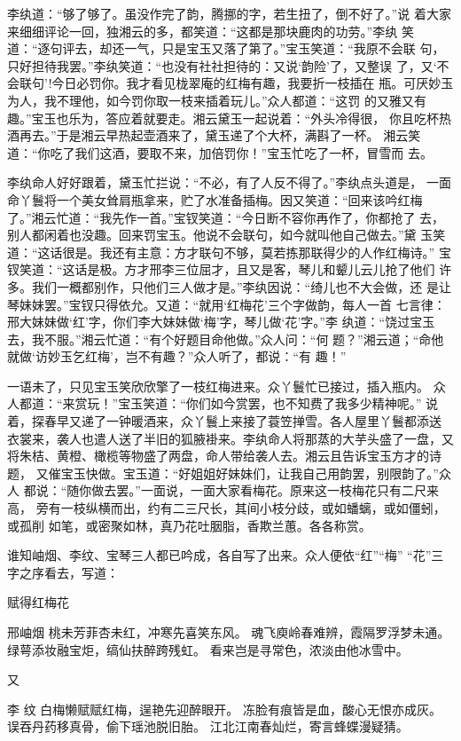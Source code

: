 李纨道：“够了够了。虽没作完了韵，腾挪的字，若生扭了，倒不好了。”说
着大家来细细评论一回，独湘云的多，都笑道：“这都是那块鹿肉的功劳。”李纨
笑道：“逐句评去，却还一气，只是宝玉又落了第了。”宝玉笑道：“我原不会联
句，只好担待我罢。”李纨笑道：“也没有社社担待的：又说‘韵险’了，又整误
了，又‘不会联句’!今日必罚你。我才看见栊翠庵的红梅有趣，我要折一枝插在
瓶。可厌妙玉为人，我不理他，如今罚你取一枝来插着玩儿。”众人都道：“这罚
的又雅又有趣。”宝玉也乐为，答应着就要走。湘云黛玉一起说着：“外头冷得很，
你且吃杯热酒再去。”于是湘云早热起壶酒来了，黛玉递了个大杯，满斟了一杯。
湘云笑道：“你吃了我们这酒，要取不来，加倍罚你！”宝玉忙吃了一杯，冒雪而
去。

李纨命人好好跟着，黛玉忙拦说：“不必，有了人反不得了。”李纨点头道是，
一面命丫鬟将一个美女耸肩瓶拿来，贮了水准备插梅。因又笑道：“回来该吟红梅
了。”湘云忙道：“我先作一首。”宝钗笑道：“今日断不容你再作了，你都抢了
去，别人都闲着也没趣。回来罚宝玉。他说不会联句，如今就叫他自己做去。”黛
玉笑道：“这话很是。我还有主意：方才联句不够，莫若拣那联得少的人作红梅诗。”
宝钗笑道：“这话是极。方才邢李三位屈才，且又是客，琴儿和颦儿云儿抢了他们
许多。我们一概都别作，只他们三人做才是。”李纨因说：“绮儿也不大会做，还
是让琴妹妹罢。”宝钗只得依允。又道：“就用‘红梅花’三个字做韵，每人一首
七言律：邢大妹妹做‘红’字，你们李大妹妹做‘梅’字，琴儿做‘花’字。”李
纨道：“饶过宝玉去，我不服。”湘云忙道：“有个好题目命他做。”众人问：“何
题？”湘云道；“命他就做‘访妙玉乞红梅’，岂不有趣？”众人听了，都说：“有
趣！”

一语未了，只见宝玉笑欣欣擎了一枝红梅进来。众丫鬟忙已接过，插入瓶内。
众人都道：“来赏玩！”宝玉笑道：“你们如今赏罢，也不知费了我多少精神呢。”
说着，探春早又递了一钟暖酒来，众丫鬟上来接了蓑笠掸雪。各人屋里丫鬟都添送
衣裳来，袭人也遣人送了半旧的狐腋褂来。李纨命人将那蒸的大芋头盛了一盘，又
将朱桔、黄橙、橄榄等物盛了两盘，命人带给袭人去。湘云且告诉宝玉方才的诗题，
又催宝玉快做。宝玉道：“好姐姐好妹妹们，让我自己用韵罢，别限韵了。”众人
都说：“随你做去罢。”一面说，一面大家看梅花。原来这一枝梅花只有二尺来高，
旁有一枝纵横而出，约有二三尺长，其间小枝分歧，或如蟠螭，或如僵蚓，或孤削
如笔，或密聚如林，真乃花吐胭脂，香欺兰蕙。各各称赏。

谁知岫烟、李纹、宝琴三人都已吟成，各自写了出来。众人便依“红”“梅”
“花”三字之序看去，写道：

赋得红梅花

邢岫烟
桃未芳菲杏未红，冲寒先喜笑东风。
魂飞庾岭春难辨，霞隔罗浮梦未通。
绿萼添妆融宝炬，缟仙扶醉跨残虹。
看来岂是寻常色，浓淡由他冰雪中。

又

李
纹
白梅懒赋赋红梅，逞艳先迎醉眼开。
冻脸有痕皆是血，酸心无恨亦成灰。
误吞丹药移真骨，偷下瑶池脱旧胎。
江北江南春灿烂，寄言蜂蝶漫疑猜。

